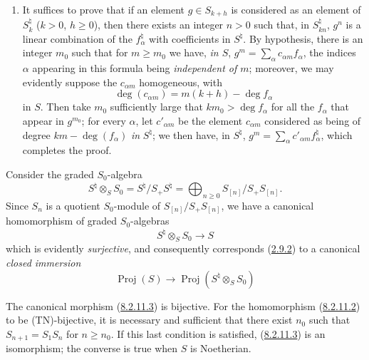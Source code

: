 \begin{enumerate}
\item[\rm(iv)] It suffices to prove that if an element $g\in S_{k+h}$ is
considered as an element of $S_k^\natural$ ($k>0$, $h\geq0$), then there
exists an integer $n>0$ such that, in $S_{kn}^\natural$, $g^n$ is a linear
combination of the $f_\alpha^\natural$ with coefficients in $S^\natural$. By
hypothesis, there is an integer $m_0$ such that for $m\geq m_0$ we have, \emph{in
$S$}, $g^m=\sum_\alpha c_{\alpha m}f_\alpha$, the indices $\alpha$ appearing
in this formula being \emph{independent of $m$}; moreover, we may
evidently suppose the $c_{\alpha m}$ homogeneous, with
\[
  \deg(c_{\alpha m})=m(k+h)-\deg f_\alpha
\]
in $S$. Then take $m_0$ sufficiently large that
$km_0>\deg f_\alpha$ for all the $f_\alpha$ that appear in $g^{m_0}$;
for every $\alpha$, let $c'_{\alpha m}$ be the element $c_{\alpha m}$ considered
as being of degree $km-\deg(f_\alpha)$ \emph{in} $S^\natural$; we then have, in
$S^\natural$, $g^m=\sum_\alpha c'_{\alpha m}f_\alpha^\natural$, which
completes the proof.
\end{enumerate}

\begin{env}[8.2.11]
\label{II.8.2.11}
Consider the graded $S_0$-algebra
\begin{equation}
\label{II.8.2.11.1}
  S^\natural\otimes_S S_0=S^\natural/S_+S^\natural
  =\bigoplus_{n\geq0}S_{[n]}/S_+S_{[n]}.
\tag{8.2.11.1}
\end{equation}
Since $S_n$ is a quotient $S_0$-module of $S_{[n]}/S_+S_{[n]}$, we have a
canonical homomorphism of graded $S_0$-algebras
\begin{equation}
\label{II.8.2.11.2}
  S^\natural\otimes_S S_0\to S
\tag{8.2.11.2}
\end{equation}
which is evidently \emph{surjective}, and consequently corresponds
(\hyperref[II.2.9.2]{2.9.2}) to a canonical \emph{closed immersion}
\begin{equation}
\label{II.8.2.11.3}
  \operatorname{Proj}(S)\to
  \operatorname{Proj}(S^\natural\otimes_S S_0)
\tag{8.2.11.3}
\end{equation}
\end{env}


\begin{proposition}[8.2.12]
\label{II.8.2.12}
The canonical morphism \textup{(\hyperref[II.8.2.11.3]{8.2.11.3})} is bijective.
For the homomorphism \textup{(\hyperref[II.8.2.11.2]{8.2.11.2})} to be
\textup{(TN)}-bijective, it is necessary and sufficient that there exist $n_0$ such that
$S_{n+1}=S_1S_n$ for $n\geq n_0$. If this last condition is satisfied,
\textup{(\hyperref[II.8.2.11.3]{8.2.11.3})} is an isomorphism; the converse is
true when $S$ is Noetherian.
\end{proposition}

